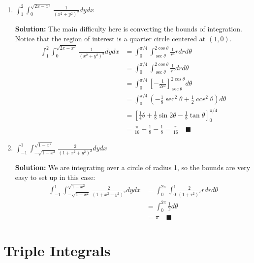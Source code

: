 \documentclass[letterpaper, 11pt]{article}
\begin{document}
\begin{enumerate}[label=(\alph*)]
\item $ \int_1^2 \int_0^{\sqrt{2x - x^2}} \frac{1}{(x^2 + y^2)^2} dy dx$
\par \textbf{Solution:} The main difficulty here is converting the bounds of integration. Notice that the region of interest is a quarter circle centered at $(1,0)$. 
\begin{align*}
\int_1^2 \int_0^{\sqrt{2x - x^2}} \frac{1}{(x^2 + y^2)^2} dy dx &=  \int_0^{\pi/4} \int_{\sec \theta}^{2\cos\theta}\frac{1}{r^4} rdr d\theta \\
&= \int_0^{\pi/4} \int_{\sec \theta}^{2\cos\theta}\frac{1}{r^3}dr d\theta \\
&= \int_0^{\pi/4} \left[-\frac{1}{2r^2} \right]_{\sec \theta}^{2\cos\theta} d\theta \\
&= \int_0^{\pi/4} \left(-\frac{1}{8} \sec^2 \theta + \frac{1}{2}\cos^2 \theta\right) d\theta \\
&= \left[ \frac{1}{4} \theta + \frac{1}{8} \sin 2 \theta - \frac{1}{8} \tan \theta \right]_0^{\pi/4} \\
&= \frac{\pi}{16} +\frac{1}{8} - \frac{1}{8} = \frac{\pi}{16} \quad\blacksquare 
\end{align*}

\item $ \int_{-1}^1 \int_{-\sqrt{1 - x^2}}^{\sqrt{1 - x^2}} \frac{2}{(1 + x^2 + y^2)^2}dy dx$
\par \textbf{Solution:} We are integrating over a circle of radius 1, so the bounds are very easy to set up in this case:
\begin{align*}
\int_{-1}^1 \int_{-\sqrt{1 - x^2}}^{\sqrt{1 - x^2}} \frac{2}{(1 + x^2 + y^2)^2}dy dx &= \int_0^{2\pi} \int_0^1 \frac{2}{(1 + r^2)^2} r dr d\theta \\
&= \int_0^{2\pi} \frac{1}{2} d \theta \\
&= \pi \quad \blacksquare
\end{align*}

\end{enumerate}

\section{Triple Integrals}
\end{document}
